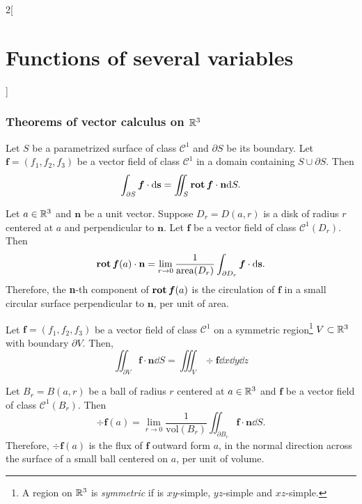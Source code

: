 \documentclass[../../../main.tex]{subfiles}
\begin{document}
\begin{multicols}{2}[\section{Functions of several variables}]
    \subsubsection*{Theorems of vector calculus on \texorpdfstring{$\mathbb{R}^3$}{R3}}
    \begin{theorem}
        Let $S$ be a parametrized surface of class $\mathcal{C}^1$ and $\partial S$ be its boundary. Let $\boldsymbol{f}=(f_1,f_2,f_3)$ be a vector field of class $\mathcal{C}^1$ in a domain containing $S\cup\partial S$. Then $$\int_{\partial S}\boldsymbol{f}\cdot \dd \textbf{s}=\iint_S\operatorname{\vb{rot}}\boldsymbol{f}\cdot\textbf{n} \dd S.$$
    \end{theorem}
    \begin{corollary}
        Let $a\in\mathbb{R}^3$ and $\textbf{n}$ be a unit vector. Suppose $D_r=D(a,r)$ is a disk of radius $r$ centered at $a$ and perpendicular to $\textbf{n}$. Let $\boldsymbol{f}$ be a vector field of class $\mathcal{C}^1(D_r)$. Then $$\operatorname{\vb{rot}}\boldsymbol{f}(a)\cdot\textbf{n}=\lim_{r\to 0}\frac{1}{\text{area}(D_r)}\int_{\partial D_r}\boldsymbol{f}\cdot \dd \textbf{s}.$$ Therefore, the \textbf{n}-th component of $\operatorname{\vb{rot}}\boldsymbol{f}(a)$ is the circulation of $\boldsymbol{f}$ in a small circular surface perpendicular to $\textbf{n}$, per unit of area.
    \end{corollary}
    \begin{theorem}
        Let $\boldsymbol{f}=(f_1,f_2,f_3)$ be a vector field of class $\mathcal{C}^1$ on a symmetric region\footnote{A region on $\mathbb{R}^3$ is \textit{symmetric} if is $xy$-simple, $yz$-simple and $xz$-simple.} $V\subset\mathbb{R}^3$ with boundary $\partial V$. Then, $$\iint_{\partial V}\boldsymbol{f}\cdot\textbf{n} \dd S=\iiint_V\div\boldsymbol{f}\dd x\dd y\dd z$$
    \end{theorem}\pagebreak
    \begin{corollary}
        Let $B_r=B(a,r)$ be a ball of radius $r$ centered at $a\in\mathbb{R}^3$ and $\boldsymbol{f}$ be a vector field of class $\mathcal{C}^1(B_r)$. Then $$\div\boldsymbol{f}(a)=\lim_{r\to 0}\frac{1}{\text{vol}(B_r)}\iint_{\partial B_r}\boldsymbol{f}\cdot\textbf{n} \dd S.$$ Therefore, $\div\boldsymbol{f}(a)$ is the flux of $\boldsymbol{f}$ outward form $a$, in the normal direction across the surface of a small ball centered on $a$, per unit of volume.
    \end{corollary}
\end{multicols}
\end{document}
